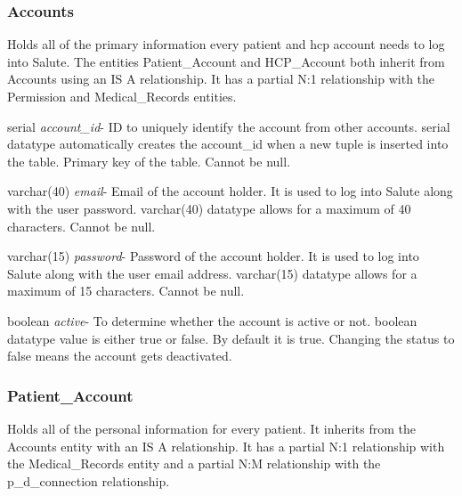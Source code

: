 \documentclass[10pt]{report}
\begin{document}
\subsubsection{Accounts}
Holds all of the primary information every patient and hcp account needs to log into Salute.  The entities Patient\_Account and HCP\_Account both inherit from Accounts using an IS A relationship.  It has a partial N:1 relationship with the Permission and Medical\_Records entities.

\begin{description}
\item serial \textit{account\_id}- ID to uniquely identify the account from other accounts. serial datatype automatically creates the account\_id when a new tuple is inserted into the table.  Primary key of the table.  Cannot be null.
\item varchar(40) \textit{email}- Email of the account holder. It is used to log into Salute along with the user password.  varchar(40) datatype allows for a maximum of 40 characters.  Cannot be null.
\item varchar(15) \textit{password}-  Password of the account holder.  It is used to log into Salute along with the user email address.  varchar(15) datatype allows for a maximum of 15 characters.  Cannot be null.
\item boolean \textit{active}- To determine whether the account is active or not.  boolean datatype value is either true or false.  By default it is true.  Changing the status to false means the account gets deactivated.
\end{description}

\subsubsection{Patient\_Account}
Holds all of the personal information for every patient.  It inherits from the Accounts entity with an IS A relationship.  It has a partial N:1 relationship with the Medical\_Records entity and a partial N:M relationship with the p\_d\_connection relationship.
\end{document}
